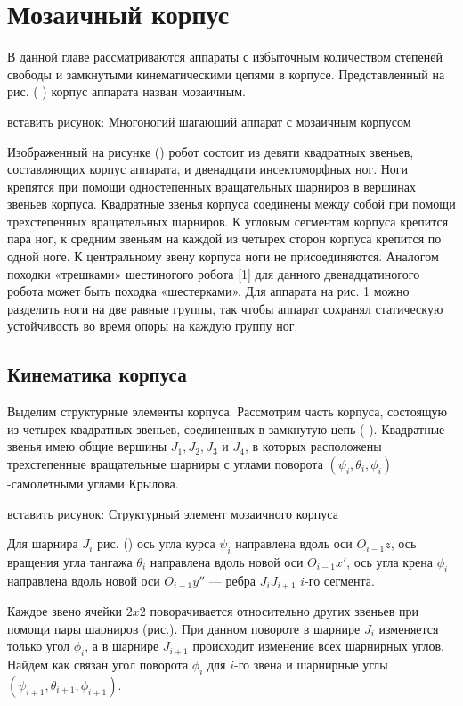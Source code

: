 \chapter{Мозаичный корпус}

В данной главе рассматриваются аппараты с избыточным количеством степеней свободы и замкнутыми кинематическими цепями в корпусе. Представленный на рис. (  ) 
корпус аппарата назван мозаичным.

вставить рисунок: Многоногий шагающий аппарат с мозаичным корпусом

Изображенный на рисунке () робот состоит из девяти квадратных звеньев, составляющих корпус аппарата, и двенадцати инсектоморфных ног. Ноги крепятся при помощи одностепенных вращательных шарниров в вершинах звеньев корпуса. Квадратные звенья корпуса соединены между собой при помощи трехстепенных вращательных шарниров. К угловым сегментам корпуса крепится пара ног, к средним звеньям на каждой из четырех сторон корпуса крепится по одной ноге. К центральному звену корпуса ноги не присоединяются. Аналогом походки «трешками» шестиногого робота [1] для данного двенадцатиногого робота может быть походка «шестерками». Для аппарата на рис. 1 можно разделить ноги на две равные группы, так чтобы аппарат сохранял статическую устойчивость во время опоры на каждую группу ног.

\section{Кинематика корпуса}
Выделим структурные элементы корпуса. Рассмотрим часть корпуса, состоящую из четырех квадратных звеньев, соединенных в замкнутую цепь ( ). Квадратные звенья имею общие вершины $J_1, J_2, J_3$ и $J_4$, в которых расположены трехстепенные вращательные шарниры с углами поворота $(\psi_i,\theta_i,\phi_i)$ -самолетными углами Крылова.

вставить рисунок: Структурный элемент мозаичного корпуса

Для шарнира $J_i$ рис. () ось угла курса $\psi_i$ направлена вдоль оси $O_{i-1}z$, ось вращения угла тангажа $\theta_i$ направлена вдоль новой оси $O_{i-1}x'$, ось угла крена $\phi_i$ направлена вдоль новой оси $O_{i-1}y''$ --- ребра $J_iJ_{i+1}$ $i$-го сегмента.

Каждое звено ячейки $2x2$ поворачивается относительно других звеньев при помощи пары шарниров (рис.). При данном повороте в шарнире $J_i$ изменяется только угол $\phi_i$, а в шарнире $J_{i+1}$ происходит изменение всех шарнирных углов. Найдем как связан угол поворота $\phi_i$ для $i$-го звена и шарнирные углы $(\psi_{i+1},\theta_{i+1},\phi_{i+1})$.

